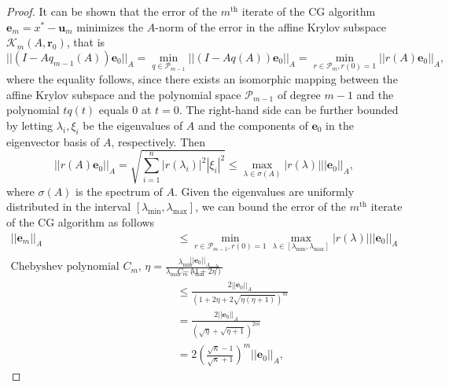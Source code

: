 \begin{proof}
It can be shown \cite[lemma 6.28 and theorem 6.29]{iter_method_saad} that the error of the $m^{\text{th}}$ iterate of the CG algorithm $\mathbf{e}_m = x^* - \mathbf{u}_m$ minimizes the $A$-norm of the error in the affine Krylov subspace $\mathcal{K}_m(A, \mathbf{r}_0)$, that is
\begin{equation}
  ||(I - Aq_{m-1}(A))\mathbf{e}_0||_A = \min_{q \in \mathcal{P}_{m-1}} ||(I - Aq(A))\mathbf{e}_0||_A = \min_{r \in \mathcal{P}_{m}, r(0) = 1} ||r(A)\mathbf{e}_0||_A,
  \label{eq:cg_convergence_rate}
\end{equation}
where the equality follows, since there exists an isomorphic mapping between the affine Krylov subspace and the polynomial space $\mathcal{P}_{m-1}$ of degree $m-1$ and the polynomial $tq(t)$ equals $0$ at $t=0$. The right-hand side can be further bounded by letting $\lambda_i, \xi_i$ be the eigenvalues of $A$ and the components of $\mathbf{e}_0$ in the eigenvector basis of $A$, respectively. Then
\[
  ||r(A)\mathbf{e}_0||_A = \sqrt{\sum_{i=1}^n |r(\lambda_i)|^2 |\xi_i|^2} \leq \max_{\lambda \in \sigma(A)} |r(\lambda)| ||\mathbf{e}_0||_A,
\]
where $\sigma(A)$ is the spectrum of $A$. Given the eigenvalues are uniformly distributed in the interval $[\lambda_{\text{min}}, \lambda_{\text{max}}]$, we can bound the error of the $m^{\text{th}}$ iterate of the CG algorithm as follows
\begin{align*}
  ||\mathbf{e}_m||_A                                                                                                                          &
  \leq \min_{r \in \mathcal{P}_{m-1}, r(0) = 1} \max_{\lambda \in [\lambda_{\text{min}}, \lambda_{\text{max}}]} |r(\lambda)| ||\mathbf{e}_0||_A                                                                                                            \\
  \text{Chebyshev polynomial } C_m \text{, } \eta=\frac{\lambda_{\text{min}}}{\lambda_{\text{max}}-\lambda_{\text{min}}} \rightarrow & \frac{||\mathbf{e}_0||_A}{C_m(1+2\eta)}                                          \\
                                                                                                                                     & \leq \frac{2||\mathbf{e}_0||_A}{\left(1 + 2\eta + 2\sqrt{\eta(\eta+1)}\right)^m} \\
                                                                                                                                     & = \frac{2||\mathbf{e}_0||_A}{\left(\sqrt{\eta} + \sqrt{\eta + 1}\right)^{2m}}    \\
                                                                                                                                     & = 2 \left(\frac{\sqrt{\kappa}-1}{\sqrt{\kappa} + 1}\right)^m ||\mathbf{e}_0||_A,
\end{align*}
\end{proof}
